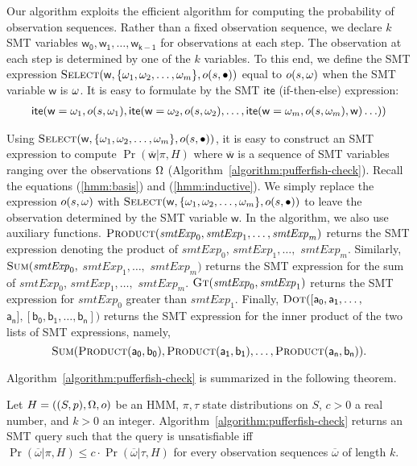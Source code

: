 Our algorithm exploits the efficient algorithm for computing the
probability of observation sequences. Rather than a fixed observation 
sequence, we declare $k$ SMT variables $\mathsf{w_0}, \mathsf{w_1},
\ldots, \mathsf{w_{k-1}}$ for observations at each step. The
observation at each step is determined by one of the $k$ variables. To
this end, we define the SMT expression
$\textmd{\textsc{Select}} (\mathsf{w}, \{ \omega_1, \omega_2, \ldots,
\omega_m\}, o (s, \bullet))$  equal to $o (s, \omega)$ when the SMT
variable $\mathsf{w}$ is $\omega$. It is easy to formulate by
the SMT $\mathsf{ite}$ (if-then-else) expression:
\begin{align*}
  \mathsf{ite} (\mathsf{w} = \omega_1, o (s, \omega_1),
  \mathsf{ite} (\mathsf{w} = \omega_2, o (s, \omega_2),
  \ldots
  ,\mathsf{ite} (\mathsf{w} = \omega_m, o (s, \omega_m), \mathsf{w})
  \ldots))
\end{align*}

Using $\textmd{\textsc{Select}} (\mathsf{w}, \{ \omega_1, \omega_2,
\ldots, \omega_m\}, o (s, \bullet))$, it is easy to construct an SMT
expression to compute $\Pr (\overline{\mathsf{w}} | \pi, H)$ where
$\overline{\mathsf{w}}$ is a sequence of SMT variables ranging over
the observations $\Omega$ (Algorithm~\ref{algorithm:pufferfish-check}).
Recall the equations (\ref{hmm:basis}) and (\ref{hmm:inductive}). We
simply replace the expression $o (s, \omega)$ with
$\textmd{\textsc{Select}} (\mathsf{w}, \{ \omega_1, \omega_2, \ldots,
\omega_m\}, o (s, \bullet))$ to leave the observation determined by the
SMT variable $\mathsf{w}$. In the algorithm, we also use auxiliary
functions. 
$\textmd{\textsc{Product}}(\mathit{smtExp}_0, \mathit{smtExp}_1,
\ldots, \mathit{smtExp}_m)$
returns the SMT expression denoting the product of
$\mathit{smtExp}_0$, $\mathit{smtExp}_1, \ldots,$
$\mathit{smtExp}_m$. Similarly, 
$\textmd{\textsc{Sum}}(\mathit{smtExp}_0,$ $\mathit{smtExp}_1, \ldots,$
$\mathit{smtExp}_m)$ returns the SMT expression for the sum
of $\mathit{smtExp}_0$, $\mathit{smtExp}_1, \ldots,$
$\mathit{smtExp}_m$. $\textmd{\textsc{Gt}} (\mathit{smtExp}_0,
\mathit{smtExp}_1)$ returns the SMT expression for
$\mathit{smtExp}_0$ greater than $\mathit{smtExp}_1$.
Finally, 
$\textmd{\textsc{Dot}} ([\mathsf{a_0}, \mathsf{a_1}, \ldots,$
$\mathsf{a_n}], [\mathsf{b_0}, \mathsf{b_1}, \ldots, \mathsf{b_n}])$
returns the SMT expression for the inner product of the two lists of
SMT expressions, namely,
\[
  \textmd{\textsc{Sum}} (
  \textmd{\textsc{Product}}(\mathsf{a_0}, \mathsf{b_0}),
  \textmd{\textsc{Product}}(\mathsf{a_1}, \mathsf{b_1}),
  \ldots,
  \textmd{\textsc{Product}}(\mathsf{a_n}, \mathsf{b_n})
  ).
\]

Algorithm~\ref{algorithm:pufferfish-check} is summarized in the
following theorem. 

\begin{theorem}
  Let $H = ((S, p), \Omega, o)$ be an HMM, $\pi, \tau$ state
  distributions on $S$, $c > 0$ a real number, and $k > 0$ an
  integer. Algorithm~\ref{algorithm:pufferfish-check} returns an SMT
  query such that the query is unsatisfiable iff
  $\Pr (\overline{\omega} | \pi, H) \leq c \cdot
  \Pr (\overline{\omega} | \tau, H)$ for every observation
  sequences $\overline{\omega}$ of length $k$.
\end{theorem}


